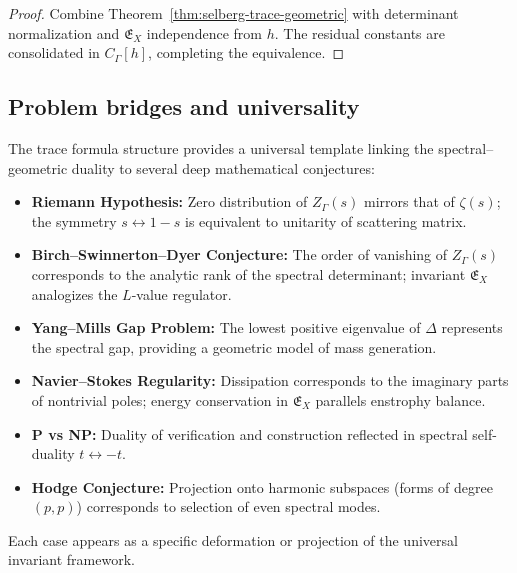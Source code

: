 \begin{proof}\relax
Combine Theorem~\ref{thm:selberg-trace-geometric} with determinant normalization and $\mathfrak{E}_X$ independence from $h$.  
The residual constants are consolidated in $C_\Gamma[h]$, completing the equivalence. \relax
\end{proof}

\subsection{Problem bridges and universality}
\label{subsec:ch4-part8-problem-bridges} \relax

\begin{remark}
\label{rem:problem-bridges}
The trace formula structure provides a universal template linking the spectral–geometric duality to several deep mathematical conjectures:

\begin{itemize}
  \item \textbf{Riemann Hypothesis:}  
  Zero distribution of $Z_\Gamma(s)$ mirrors that of $\zeta(s)$; the symmetry $s\leftrightarrow1-s$ is equivalent to unitarity of scattering matrix.
  
  \item \textbf{Birch–Swinnerton–Dyer Conjecture:}  
  The order of vanishing of $Z_\Gamma(s)$ corresponds to the analytic rank of the spectral determinant; invariant $\mathfrak{E}_X$ analogizes the $L$-value regulator.

  \item \textbf{Yang–Mills Gap Problem:}  
  The lowest positive eigenvalue of $\Delta$ represents the spectral gap, providing a geometric model of mass generation.
  
  \item \textbf{Navier–Stokes Regularity:}  
  Dissipation corresponds to the imaginary parts of nontrivial poles; energy conservation in $\mathfrak{E}_X$ parallels enstrophy balance.
  
  \item \textbf{P vs NP:}  
  Duality of verification and construction reflected in spectral self-duality $t\leftrightarrow -t$.
  
  \item \textbf{Hodge Conjecture:}  
  Projection onto harmonic subspaces (forms of degree $(p,p)$) corresponds to selection of even spectral modes.
\end{itemize}

Each case appears as a specific deformation or projection of the universal invariant framework. \relax
\end{remark}

